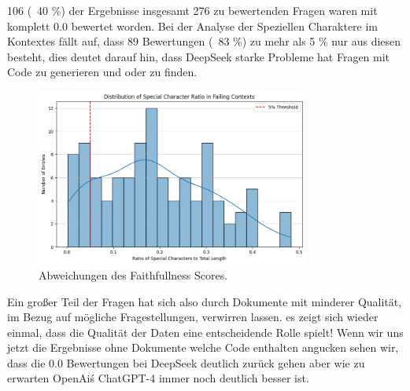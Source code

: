 106 (~40 \%) der Ergebnisse insgesamt 276 zu bewertenden Fragen waren mit komplett 0.0 bewertet worden. Bei der Analyse der Speziellen Charaktere im Kontextes fällt auf, dass 89 Bewertungen (~83 \%) zu mehr als 5 \% nur aus diesen besteht, dies deutet darauf hin, dass DeepSeek starke Probleme hat Fragen mit Code zu generieren und oder zu finden.
\begin{figure}[htbp]
    \centering
    \includegraphics[width=0.8\textwidth]{images/3_3_special_characters.png}
    \caption{Abweichungen des Faithfullness Scores.}
    \label{fig:sample-image}
\end{figure}

Ein großer Teil der Fragen hat sich also durch Dokumente mit minderer Qualität, im Bezug auf mögliche Fragestellungen, verwirren lassen.
es zeigt sich wieder einmal, dass die Qualität der Daten eine entscheidende Rolle spielt!
Wenn wir uns jetzt die Ergebnisse ohne Dokumente welche Code enthalten angucken sehen wir, dass die 0.0 Bewertungen bei DeepSeek deutlich zurück gehen aber wie zu erwarten OpenAi\'s ChatGPT-4 immer noch deutlich besser ist.

